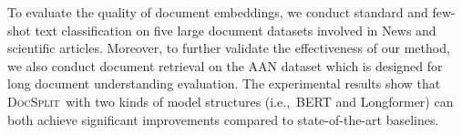 \documentclass[11pt]{article}
\newcommand{\our}{\mbox{\textsc{DocSplit}}}
\begin{document}
To evaluate the quality of document embeddings, we conduct standard and few-shot text classification on five large document datasets involved in News and scientific articles. Moreover, to further validate the effectiveness of our method, we also conduct document retrieval on the AAN dataset which is designed for long document understanding evaluation.
The experimental results show that \our~with two kinds of model structures (i.e.,~BERT and Longformer) can both achieve significant improvements compared to state-of-the-art baselines.




\end{document}

